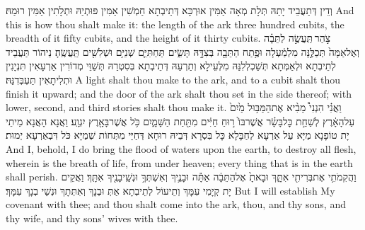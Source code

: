 {וְדֵין דְּתַעֲבֵיד יָתַהּ תְּלָת מְאָה אַמִּין אוּרְכָּא דְּתֵיבְתָא חַמְשִׁין אַמִּין פּוּתְיַהּ וּתְלָתִין אַמִּין רוּמַהּ׃}
{And this is how thou shalt make it: the length of the ark three hundred cubits, the breadth of it fifty cubits, and the height of it thirty cubits.}{}
{צֹ֣הַר \legarmeh  תַּֽעֲשֶׂ֣ה לַתֵּבָ֗ה וְאֶל\maqqaf אַמָּה֙ תְּכַלֶּ֣נָּה מִלְמַ֔עְלָה וּפֶ֥תַח הַתֵּבָ֖ה בְּצִדָּ֣הּ תָּשִׂ֑ים תַּחְתִּיִּ֛ם שְׁנִיִּ֥ם וּשְׁלִשִׁ֖ים תַּֽעֲשֶֽׂהָ׃}
{נֵיהוֹר תַּעֲבֵיד לְתֵיבְתָא וּלְאַמְּתָא תְּשַׁכְלְלִנַּהּ מִלְּעֵילָא וְתַרְעַהּ דְּתֵיבְתָא בְּסִטְרַהּ תְּשַׁוֵּי מְדוֹרִין אַרְעָאִין תִּנְיָנִין וּתְלִיתָאִין תַּעְבְּדִנַּהּ׃}
{A light shalt thou make to the ark, and to a cubit shalt thou finish it upward; and the door of the ark shalt thou set in the side thereof; with lower, second, and third stories shalt thou make it.}{}
{וַאֲנִ֗י הִנְנִי֩ מֵבִ֨יא אֶת\maqqaf הַמַּבּ֥וּל מַ֙יִם֙ עַל\maqqaf הָאָ֔רֶץ לְשַׁחֵ֣ת כׇּל\maqqaf בָּשָׂ֗ר אֲשֶׁר\maqqaf בּוֹ֙ ר֣וּחַ חַיִּ֔ים מִתַּ֖חַת הַשָּׁמָ֑יִם כֹּ֥ל אֲשֶׁר\maqqaf בָּאָ֖רֶץ יִגְוָֽע׃}
{וַאֲנָא הָאֲנָא מֵיתֵי יָת טוֹפָנָא מַיָּא עַל אַרְעָא לְחַבָּלָא כָּל בִּסְרָא דְּבֵיהּ רוּחָא דְּחַיֵּי מִתְּחוֹת שְׁמַיָּא כֹּל דִּבְאַרְעָא יְמוּת׃}
{And I, behold, I do bring the flood of waters upon the earth, to destroy all flesh, wherein is the breath of life, from under heaven; every thing that is in the earth shall perish.}{}
{וַהֲקִמֹתִ֥י אֶת\maqqaf בְּרִיתִ֖י אִתָּ֑ךְ וּבָאתָ֙ אֶל\maqqaf הַתֵּבָ֔ה אַתָּ֕ה וּבָנֶ֛יךָ וְאִשְׁתְּךָ֥ וּנְשֵֽׁי\maqqaf בָנֶ֖יךָ אִתָּֽךְ׃}
{וַאֲקֵים יָת קְיָמִי עִמָּךְ וְתֵיעוֹל לְתֵיבְתָא אַתְּ וּבְנָךְ וְאִתְּתָךְ וּנְשֵׁי בְנָךְ עִמָּךְ׃}
{But I will establish My covenant with thee; and thou shalt come into the ark, thou, and thy sons, and thy wife, and thy sons’  wives with thee.}{}
